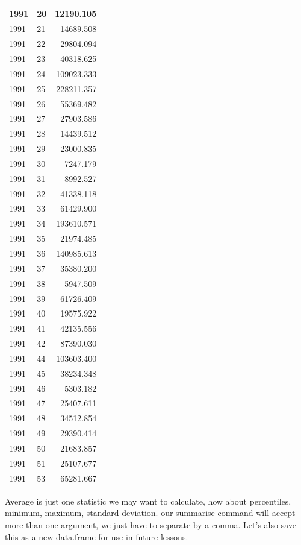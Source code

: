 \documentclass[
]{book}
\begin{document}
\begin{tabular}{l|l|r}
\hline
1991 & 20 & 12190.105\\
\hline
1991 & 21 & 14689.508\\
\hline
1991 & 22 & 29804.094\\
\hline
1991 & 23 & 40318.625\\
\hline
1991 & 24 & 109023.333\\
\hline
1991 & 25 & 228211.357\\
\hline
1991 & 26 & 55369.482\\
\hline
1991 & 27 & 27903.586\\
\hline
1991 & 28 & 14439.512\\
\hline
1991 & 29 & 23000.835\\
\hline
1991 & 30 & 7247.179\\
\hline
1991 & 31 & 8992.527\\
\hline
1991 & 32 & 41338.118\\
\hline
1991 & 33 & 61429.900\\
\hline
1991 & 34 & 193610.571\\
\hline
1991 & 35 & 21974.485\\
\hline
1991 & 36 & 140985.613\\
\hline
1991 & 37 & 35380.200\\
\hline
1991 & 38 & 5947.509\\
\hline
1991 & 39 & 61726.409\\
\hline
1991 & 40 & 19575.922\\
\hline
1991 & 41 & 42135.556\\
\hline
1991 & 42 & 87390.030\\
\hline
1991 & 44 & 103603.400\\
\hline
1991 & 45 & 38234.348\\
\hline
1991 & 46 & 5303.182\\
\hline
1991 & 47 & 25407.611\\
\hline
1991 & 48 & 34512.854\\
\hline
1991 & 49 & 29390.414\\
\hline
1991 & 50 & 21683.857\\
\hline
1991 & 51 & 25107.677\\
\hline
1991 & 53 & 65281.667\\
\hline
\end{tabular}

Average is just one statistic we may want to calculate, how about percentiles, minimum, maximum, standard deviation. our summarise command will accept more than one argument, we just have to separate by a comma. Let's also save this as a new data.frame for use in future lessons.
\end{document}
